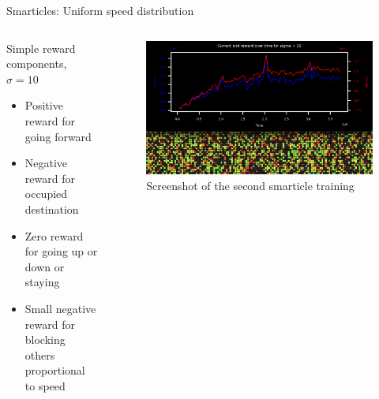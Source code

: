 \documentclass[10pt,xcolor=table, aspectratio=1610]{beamer}
\begin{document}
\begin{frame}{Smarticles: Uniform speed distribution}
  \begin{columns}
    \begin{block}{Simple reward components, $\sigma=10$}
      \begin{itemize}
        \item Positive reward for going forward
        \item Negative reward for occupied destination
        \item Zero reward for going up or down or staying
        \item Small negative reward for blocking others proportional to speed
      \end{itemize}
    \end{block}
    \begin{figure}
        \includegraphics[width=\textwidth]{../Thesis/img/results/second_training_screenshot.png}
        \caption*{Screenshot of the second smarticle training}
      \end{figure}
  \end{columns}
\end{frame}
\end{document}
